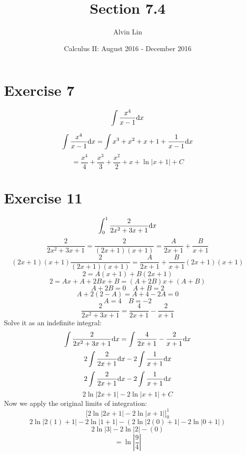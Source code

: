 \documentclass{math}
\title{Section 7.4}
\author{Alvin Lin}
\date{Calculus II: August 2016 - December 2016}
\begin{document}
\maketitle

\section*{Exercise 7}
\[ \int{\frac{x^{4}}{x-1}\mathrm{d}{x}} \]
\begin{center}
\end{center}
\[ \int{\frac{x^{4}}{x-1}\mathrm{d}{x}} =
   \int{x^{3}+x^{2}+x+1+\frac{1}{x-1}\mathrm{d}{x}} \]
\[ = \frac{x^{4}}{4}+\frac{x^{3}}{3}+\frac{x^{2}}{2}+x+\ln|x+1|+C \]

\section*{Exercise 11}
\[ \int_{0}^{1}{\frac{2}{2x^{2}+3x+1}\mathrm{d}{x}} \]
\[ \frac{2}{2x^{2}+3x+1} = \frac{2}{(2x+1)(x+1)} =
   \frac{A}{2x+1}+\frac{B}{x+1} \]
\[ (2x+1)(x+1)\frac{2}{(2x+1)(x+1)} = \frac{A}{2x+1}+\frac{B}{x+1}(2x+1)(x+1) \]
\[ 2 = A(x+1)+B(2x+1) \]
\[ 2 = Ax + A + 2Bx + B = (A+2B)x+(A+B) \]
\[ A+2B = 0 \quad A+B = 2 \]
\[ A+2(2-A) = A+4-2A = 0 \]
\[ A = 4 \quad B = -2 \]
\[ \frac{2}{2x^{2}+3x+1} = \frac{4}{2x+1}-\frac{2}{x+1} \]
Solve it as an indefinite integral:
\[ \int{\frac{2}{2x^{2}+3x+1}\mathrm{d}{x}} =
   \int{\frac{4}{2x+1}-\frac{2}{x+1}\mathrm{d}{x}} \]
\[ 2\int{\frac{2}{2x+1}\mathrm{d}{x}}-2\int{\frac{1}{x+1}\mathrm{d}{x}} \]
\[ 2\int{\frac{2}{2x+1}\mathrm{d}{x}}-2\int{\frac{1}{x+1}\mathrm{d}{x}} \]
\[ 2\ln|2x+1|-2\ln|x+1|+C \]
Now we apply the original limits of integration:
\[ \bigg[2\ln|2x+1|-2\ln|x+1|\bigg]_{0}^{1} \]
\[ 2\ln|2(1)+1|-2\ln|1+1|-(2\ln|2(0)+1|-2\ln|0+1|) \]
\[ 2\ln|3|-2\ln|2|-(0) \]
\[ = \ln|\frac{9}{4}| \]
\end{document}
